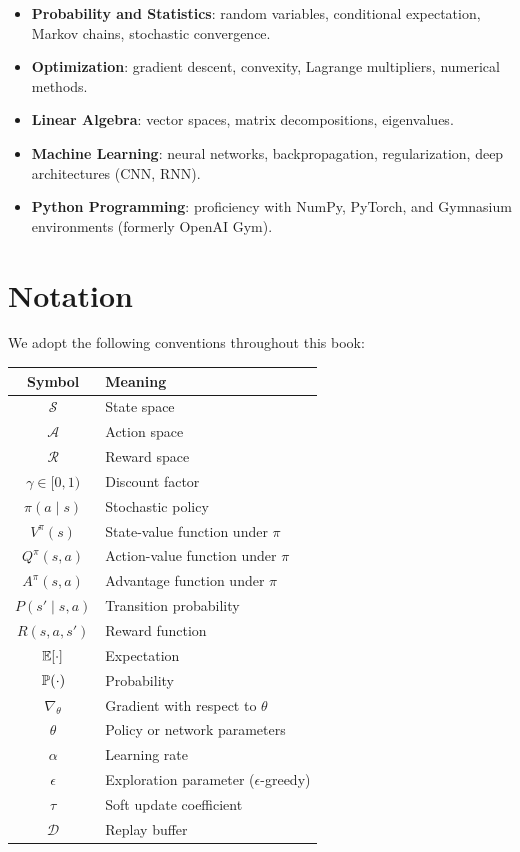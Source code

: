 \begin{itemize}
    \item \textbf{Probability and Statistics}: random variables, conditional
    expectation, Markov chains, stochastic convergence.

    \item \textbf{Optimization}: gradient descent, convexity, Lagrange multipliers,
    numerical methods.

    \item \textbf{Linear Algebra}: vector spaces, matrix decompositions, eigenvalues.

    \item \textbf{Machine Learning}: neural networks, backpropagation,
    regularization, deep architectures (CNN, RNN).

    \item \textbf{Python Programming}: proficiency with NumPy, PyTorch, and
    Gymnasium environments (formerly OpenAI Gym).
\end{itemize}

\section*{Notation}

We adopt the following conventions throughout this book:

\begin{center}
\renewcommand{\arraystretch}{1.3}
\begin{tabular}{cl}
    \toprule
    \textbf{Symbol} & \textbf{Meaning} \\
    \midrule
    $\mathcal{S}$ & State space \\
    $\mathcal{A}$ & Action space \\
    $\mathcal{R}$ & Reward space \\
    $\gamma \in [0,1)$ & Discount factor \\
    $\pi(a \mid s)$ & Stochastic policy \\
    $V^\pi(s)$ & State-value function under $\pi$ \\
    $Q^\pi(s,a)$ & Action-value function under $\pi$ \\
    $A^\pi(s,a)$ & Advantage function under $\pi$ \\
    $P(s' \mid s, a)$ & Transition probability \\
    $R(s, a, s')$ & Reward function \\
    $\mathbb{E}[\cdot]$ & Expectation \\
    $\mathbb{P}(\cdot)$ & Probability \\
    $\nabla_\theta$ & Gradient with respect to $\theta$ \\
    $\theta$ & Policy or network parameters \\
    $\alpha$ & Learning rate \\
    $\epsilon$ & Exploration parameter ($\epsilon$-greedy) \\
    $\tau$ & Soft update coefficient \\
    $\mathcal{D}$ & Replay buffer \\
    \bottomrule
\end{tabular}
\end{center}

